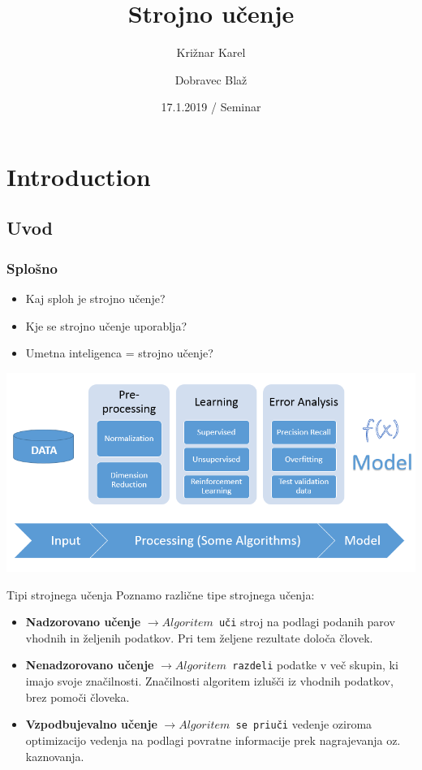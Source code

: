 \documentclass{beamer}
\title[Strojno učenje] 
{Strojno učenje}
\author[Križnar Karel, Dobravec Blaž]
{Križnar Karel \and Dobravec Blaž}
\institute
{
  Praktična matematika\\
  Fakulteta za matematiko in fiziko
}
\date
{17.1.2019 / Seminar}
\begin{document}
\begin{frame}
  \titlepage
\end{frame}





\section{Introduction}

\subsection[uvod]{Uvod}


\begin{frame}
\frametitle[alignment=center]{Splošno} %
  \begin{itemize}
  \item
    Kaj sploh je strojno učenje?
  \item
    Kje se strojno učenje uporablja?
  \item
    Umetna inteligenca = strojno učenje?
  \end{itemize}
\bigskip
\includegraphics[scale = 0.3]{photo/ucenje_proces}
\end{frame}

\begin{frame}{Tipi strojnega učenja}
\bigskip
  Poznamo različne tipe strojnega učenja: \smallskip

  \begin{itemize}
  \item 
    \textbf{Nadzorovano učenje} $\rightarrow Algoritem $\texttt{ uči}  stroj na podlagi podanih parov vhodnih in željenih podatkov. Pri tem željene rezultate določa človek.
  \item 
     \textbf{Nenadzorovano učenje} $\rightarrow  Algoritem $\texttt{ razdeli} podatke v več skupin, ki imajo svoje značilnosti. Značilnosti algoritem izlušči iz vhodnih podatkov, brez pomoči človeka.
  \item 
     \textbf{Vzpodbujevalno učenje} $\rightarrow Algoritem $\texttt{ se priuči} vedenje oziroma optimizacijo vedenja na podlagi povratne informacije prek nagrajevanja oz. kaznovanja.
  \end{itemize}
\end{frame}
\end{document}
